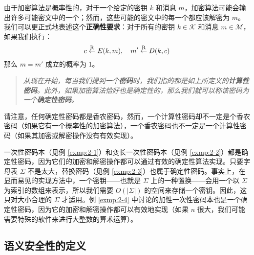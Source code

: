 由于加密算法是概率性的，对于一个给定的密钥 $k$ 和消息 $m$，加密算法可能会输出许多可能密文中的一个；然而，这些可能的密文中的每一个都应该解密为 $m$。我们可以更正式地表述这个\textbf{正确性要求}：对于所有的密钥 $k\in\mathcal{K}$ 和消息 $m\in\mathcal{M}$，如果我们执行：
\[
c\overset{\rm R}\leftarrow E(k,m),
\quad
m'\overset{\rm R}\leftarrow D(k,c)
\]
那么 $m=m'$ 成立的概率为 $1$。

\begin{quote}
\begin{tcolorbox}[colframe=black,colback=white,boxrule=0.6pt,arc=0pt]
\emph{从现在开始，每当我们提到一个\textbf{密码}时，我们指的都是如上所定义的\textbf{计算性密码}。此外，如果加密算法恰好也是确定性的，那么我们就可以称该密码为一个\textbf{确定性密码}。}
\end{tcolorbox}
\end{quote}

请注意，任何确定性密码都是香农密码，然而，一个计算性密码却不一定是个香农密码（如果它有一个概率性的加密算法），一个香农密码也不一定是一个计算性密码（如果其加密或解密操作没有有效实现）。

\begin{example}
一次性密码本（见例 \ref{exmp:2-1}）和变长一次性密码本（见例 \ref{exmp:2-2}）都是确定性密码，因为它们的加密和解密操作都可以通过有效的确定性算法实现。只要字母表 $\Sigma$ 不是太大，替换密码（见例 \ref{exmp:2-3}）也属于确定性密码。事实上，在显而易见的实现方法中，一个密钥——也就是 $\Sigma$ 上的一种置换——会用一个以 $\Sigma$ 为索引的数组来表示，所以我们需要 $O(|\Sigma|)$ 的空间来存储一个密钥。因此，这只对大小合理的 $\Sigma$ 才适用。例 \ref{exmp:2-4} 中讨论的加性一次性密码本也是一个确定性密码，因为它的加密和解密操作都可以有效地实现（如果 $n$ 很大，我们可能需要特殊的软件来进行大整数的算术运算）。
\end{example}

\subsection{语义安全性的定义}

